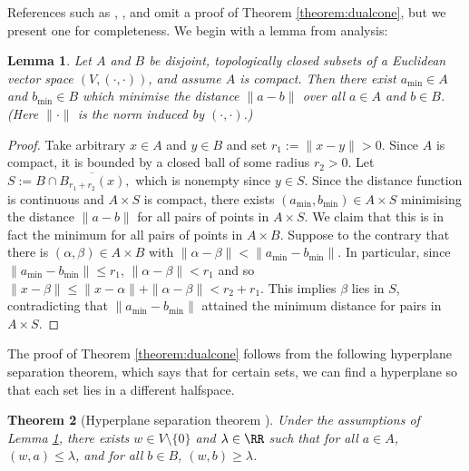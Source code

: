 \documentclass[12pt]{amsart}
\theoremstyle{plain}
\newtheorem{theorem}{Theorem}%
\newtheorem{lemma}[theorem]{Lemma}
\begin{document}
References such as \cite{Fulton93}, \cite{CLS11}, and \cite{Oda88} omit a proof of Theorem \ref{theorem:dualcone}, but we present one for completeness.
We begin with a lemma from analysis:

\begin{lemma}\label{lemma:mindistance}
Let $A$ and $B$ be disjoint, topologically closed subsets of a Euclidean vector space $(V, (\cdot,\cdot))$, and assume $A$ is compact.
Then there exist $a_{\text{min}} \in A$ and $b_{\text{min}} \in B$ which minimise the distance $\|a-b\|$ over all $a \in A$ and $b \in B$.
(Here $\|\cdot\|$ is the norm induced by $(\cdot,\cdot)$.)
\end{lemma}
\begin{proof}
Take arbitrary $x \in A$ and $y \in B$ and set $r_1 := \|x-y\| > 0$.
Since $A$ is compact, it is bounded by a closed ball of some radius $r_2 > 0$.
Let $S := B \cap \overline{B_{r_1+r_2}(x)},$ which is nonempty since $y \in S$.
Since the distance function is continuous and $A \times S$ is compact, there exists $(a_{\text{min}}, b_{\text{min}}) \in A \times S$ minimising the distance $\|a - b\|$ for all pairs of points in $A \times S$.
We claim that this is in fact the minimum for all pairs of points in $A \times B$.
Suppose to the contrary that there is $(\alpha,\beta) \in A \times B$ with $\|\alpha - \beta\| < \|a_{\text{min}} - b_{\text{min}}\|$. 
In particular, since $\|a_{\text{min}} - b_{\text{min}}\|\le r_1$, $\|\alpha - \beta\| < r_1$ and so
$\|x - \beta\| \le \|x- \alpha\| + \|\alpha - \beta\| < r_2 + r_1.$
This implies $\beta$ lies in $S$, contradicting that $\|a_{\text{min}} - b_{\text{min}}\|$ attained the minimum distance for pairs in $A \times S$.
\end{proof}

The proof of Theorem \ref{theorem:dualcone} follows from the following hyperplane separation theorem, which says that for certain sets, we can find a hyperplane so that each set lies in a different halfspace.

\begin{theorem}[Hyperplane separation theorem {\cite[\S 2.5.1]{BV04}}]\label{hyperplaneseparation}
Under the assumptions of Lemma \ref{lemma:mindistance}, there exists $w \in V\setminus\{0\}$ and $\lambda \in \RR$ such that for all $a \in A$, $(w, a) \le \lambda$, and for all $b \in B$, $(w, b) \ge \lambda$.
\end{theorem}
\end{document}
